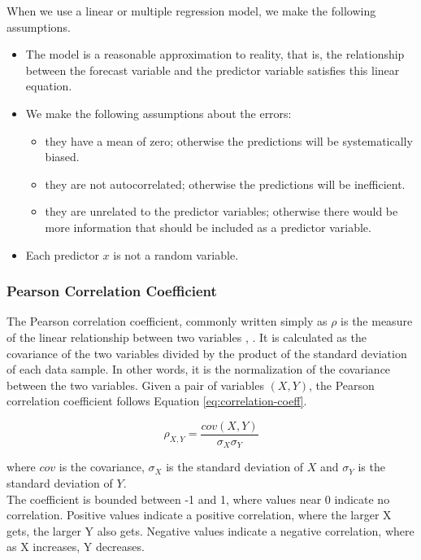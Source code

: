 When we use a linear or multiple regression model, we make the following assumptions.

\begin{itemize}
    \item The model is a reasonable approximation to reality, that is, the relationship between the forecast variable and the predictor variable satisfies this linear equation.
    \item We make the following assumptions about the errors:
    \begin{itemize}
        \item they have a mean of zero; otherwise the predictions will be systematically biased.
        \item they are not autocorrelated; otherwise the predictions will be inefficient.
        \item they are unrelated to the predictor variables; otherwise there would be more information that should be included as a predictor variable.
    \end{itemize}
    \item Each predictor $x$ is not a random variable.
\end{itemize}

\subsubsection{Pearson Correlation Coefficient}

The Pearson correlation coefficient, commonly written simply as $\rho$ is the measure of the linear relationship between two variables \cite{correlation-coeff-journal}, \cite{correlation-coeff}. It is calculated as the covariance of the two variables divided by the product of the standard deviation of each data sample. In other words, it is the normalization of the covariance between the two variables. Given a pair of variables $(X, Y)$, the Pearson correlation coefficient follows Equation \ref{eq:correlation-coeff}.

\begin{equation}
\label{eq:correlation-coeff}
    \rho_{X,Y} = \frac{cov(X,Y)}{\sigma_X\sigma_Y}
\end{equation}

where $cov$ is the covariance, $\sigma_X$ is the standard deviation of $X$ and $\sigma_Y$ is the standard deviation of $Y$. \\

The coefficient is bounded between -1 and 1, where values near 0 indicate no correlation. Positive values indicate a positive correlation, where the larger X gets, the larger Y also gets. Negative values indicate a negative correlation, where as X increases, Y decreases.

